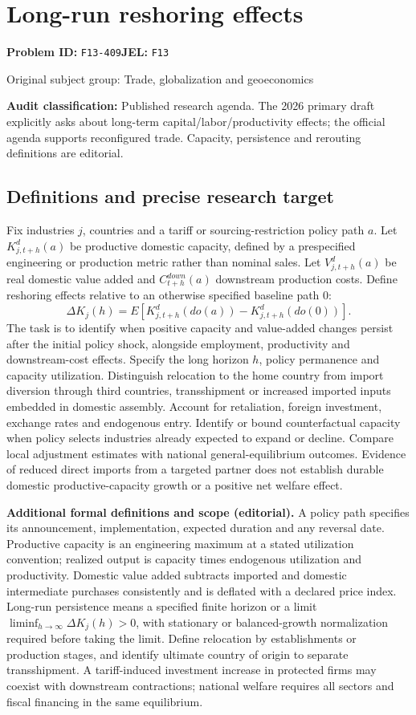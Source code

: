 \documentclass[11pt,a4paper]{article}
\begin{document}
\section*{Long-run reshoring effects}
\textbf{Problem ID:} \texttt{F13-409}\quad \textbf{JEL:} \texttt{F13}\par
\label{problem:OP-0343}
{\sffamily\small\color{muted}Original subject group: Trade, globalization and geoeconomics\par}
\label{definitions:problem:30007625}
\textbf{Audit classification:} Published research agenda. The 2026 primary draft explicitly asks about long-term capital/labor/productivity effects; the official agenda supports reconfigured trade. Capacity, persistence and rerouting definitions are editorial.
\subsection*{Definitions and precise research target}
Fix industries \(j\), countries and a tariff or sourcing-restriction policy path \(a\). Let \(K^d_{j,t+h}(a)\) be productive domestic capacity, defined by a prespecified engineering or production metric rather than nominal sales. Let \(V^d_{j,t+h}(a)\) be real domestic value added and \(C^{down}_{t+h}(a)\) downstream production costs. Define reshoring effects relative to an otherwise specified baseline path \(0\):
\[\Delta K_j(h)=E[K^d_{j,t+h}(do(a))-K^d_{j,t+h}(do(0))].\]
The task is to identify when positive capacity and value-added changes persist after the initial policy shock, alongside employment, productivity and downstream-cost effects. Specify the long horizon \(h\), policy permanence and capacity utilization. Distinguish relocation to the home country from import diversion through third countries, transshipment or increased imported inputs embedded in domestic assembly. Account for retaliation, foreign investment, exchange rates and endogenous entry. Identify or bound counterfactual capacity when policy selects industries already expected to expand or decline. Compare local adjustment estimates with national general-equilibrium outcomes. Evidence of reduced direct imports from a targeted partner does not establish durable domestic productive-capacity growth or a positive net welfare effect.

\textbf{Additional formal definitions and scope (editorial).} A policy path specifies its announcement, implementation, expected duration and any reversal date. Productive capacity is an engineering maximum at a stated utilization convention; realized output is capacity times endogenous utilization and productivity. Domestic value added subtracts imported and domestic intermediate purchases consistently and is deflated with a declared price index. Long-run persistence means a specified finite horizon or a limit \(\liminf_{h\to\infty}\Delta K_j(h)>0\), with stationary or balanced-growth normalization required before taking the limit. Define relocation by establishments or production stages, and identify ultimate country of origin to separate transshipment. A tariff-induced investment increase in protected firms may coexist with downstream contractions; national welfare requires all sectors and fiscal financing in the same equilibrium.
\end{document}

